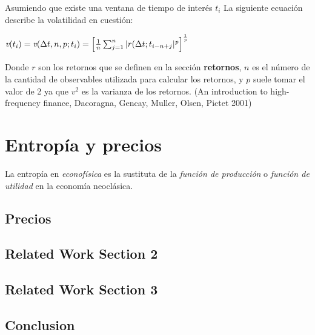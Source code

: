 Asumiendo que existe una ventana de tiempo de interés  $t_{i}$ La siguiente ecuación describe la volatilidad en cuestión:

\begin{center}

$\textit{v}(t_{i}) = \textit{v}(\Delta t, n, p; t_{i}) = \Bigl[ \frac{1}{n} \sum_{j = 1}^{n} |r (\Delta t ; t_{i-n+j}|^{\textit{p}} \Bigr]^\frac{1}{\textit{p}}$

\end{center}

Donde $\textit{r}$ son los retornos que se definen en la sección \textbf{retornos}, $\textit{n}$ es el número de la cantidad de observables utilizada para calcular los retornos, y $\textit{p}$ suele tomar el valor de 2 ya que $\textit{v}^{2}$ es la varianza de los retornos.  (An introduction to high-frequency finance, Dacoragna, Gencay, Muller, Olsen, Pictet 2001)



%
%
%
%
%
\chapter{Entropía y precios}
\label{sec:related}


La entropía en \textit{econofísica} es la sustituta de la \textit{función de producción} o \textit{función de utilidad} en la economía neoclásica. 

\section{ Precios }


\label{sec:precios}

\Blindtext[2][2]

\section{Related Work Section 2}
\label{sec:related:sec2}

\Blindtext[3][2]

\section{Related Work Section 3}
\label{sec:related:sec3}

\Blindtext[4][2]

\section{Conclusion}
\label{sec:related:conclusion}

\Blindtext[2][1]
